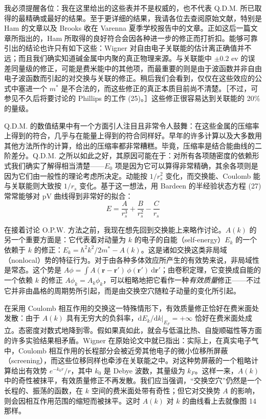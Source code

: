 我必须提醒各位：我在这里给出的这些表并不是权威的，也不代表 Q.D.M. 所已取得的最精确或最好的结果。至于更详细的结果，我请各位去查阅原始文献，特别是 Ham 的文章以及 Brooks 收在 Varenna 夏季学校报告中的文章。正如这后一篇文章所指出的，Ham 所取得的良好符合会因各种进一步的修正而打折扣。能够可靠引出的结论也许只有如下这些：Wigner 对自由电子关联能的估计离正确值并不远；而且我们确实知道碱金属中内聚的真正物理来源。与关联能中 $\pm 0.2$ ev 的误差同量级的修正，可能是费米能中的其他项，而最重要的则是由于波函数并非自由电子波函数而引起的对交换与关联的修正。稍后我们会看到，仅仅在这些效应的公式中塞进一个 $m^*$ 是不合法的，而这些修正的真正本质目前尚不清楚。［不过，可参见不久后将要讨论的 Phillips 的工作 (25)。］这些修正很容易达到关联能的 20\% 的量级。

Q.D.M. 的数值结果中有一个方面引人注目且非常令人鼓舞：在这些金属的压缩率上得到的符合，几乎与在能量上得到的符合同样好。早年的许多计算以及大多数用其他方法所作的计算，给出的压缩率都非常糟糕。毕竟，压缩率是结合能曲线的二阶差分。Q.D.M. 之所以如此之好，其原因可能在于：对所有各项随密度的依赖形式我们确实了解得相当清楚——$E_0$ 项是因为它可以算得非常精确，其余各项则是因为它们由一般性的理论考虑所决定。动能按 $1/r_s^2$ 变化，而交换能、Coulomb 能与关联能则大致按 $1/r_s$ 变化。基于这一想法，用 Bardeen 的半经验状态方程 (27) 常常能够对 pV 曲线得到非常好的拟合：
\begin{equation*}
E = \frac{A}{r_s^3} + \frac{B}{r_s^2} - \frac{C}{r_s}
\end{equation*}

在接着讨论 O.P.W. 方法之前，我现在想先回到交换能上来略作讨论。$A(k)$ 的另一个重要方面是：它代表着对动量为 $k$ 的电子的自能（self-energy）$E_k$ 的一个依赖于 $k$ 的修正：$E_k = \hbar^2 k^2/2m^* - A(k)$。这是诸如交换这类非局域（nonlocal）势的特征行为。对于由各种多体效应所产生的有效势来说，非局域性是常态。这个势是 $A\phi = \int A(\mathbf{r}-\mathbf{r}')\,\phi(\mathbf{r}')\ \mathrm{d}\mathbf{r}'$；由卷积定理，它变换成自能的一个依赖 $k$ 的修正 $A\phi_k = A_k\phi_k$，可以粗略地把它看作一种\emph{有效质量}修正——不过它并非由晶格的周期势所引起，而是由交换空穴随粒子动量的变化所引起。

在采用 Coulomb 相互作用的交换这一特殊情形下，有效质量修正恰好在费米面处发散：由于 $A(k)$ 具有无穷大的负斜率，$\mathrm{d}E_k/\mathrm{d}k\big|_{E_F} = +\infty$ 恰好在费米面处成立。态密度对数式地降到零。假如果真如此，就会与低温比热、自旋顺磁性等方面的许多实验结果相矛盾。Wigner 在原始论文中就已指出：实际上，在真实电子气中，Coulomb 相互作用的长程部分会被近旁其他电子的微小位移所屏蔽（screening），而这些位移同样也牵涉在关联能之中。对这种势屏蔽的一个粗略计算给出有效势 $e^{-k_0 r}/r$，其中 $k_0$ 是 Debye 波数，其量级为 $k_F$。这样一来，$A(k)$ 中的奇性被抹平，有效质量修正不再发散。我们应当强调，“交换空穴”仍然是一个长程的、振荡的函数，在 $k$ 空间的费米面处带有奇性；但它对交换势 $A$ 的影响，则会因相互作用范围的缩短而被抹平。这时 $A(k)$ 对 $k$ 的曲线看上去就像图 14 那样。

